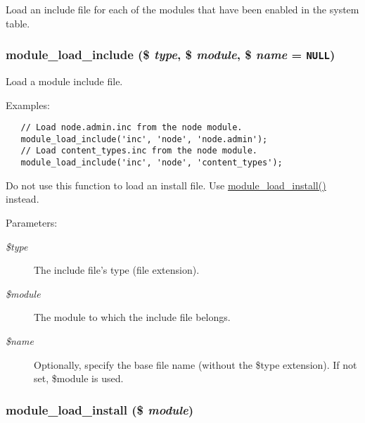 Load an include file for each of the modules that have been enabled in the system table. \hypertarget{module_8inc_49098ed4d33650ee5ab52aab40982423}{
\subsubsection[{module\_\-load\_\-include}]{\setlength{\rightskip}{0pt plus 5cm}module\_\-load\_\-include (\$ {\em type}, \/  \$ {\em module}, \/  \$ {\em name} = {\tt NULL})}}
\label{module_8inc_49098ed4d33650ee5ab52aab40982423}


Load a module include file.

Examples: 

\begin{Code}\begin{verbatim}   // Load node.admin.inc from the node module.
   module_load_include('inc', 'node', 'node.admin');
   // Load content_types.inc from the node module.
   module_load_include('inc', 'node', 'content_types');  
\end{verbatim}
\end{Code}



Do not use this function to load an install file. Use \hyperlink{module_8inc_77a6101f363c066eafbe29b26af5bfd3}{module\_\-load\_\-install()} instead.

\begin{Desc}
\item[Parameters:]
\begin{description}
\item[{\em \$type}]The include file's type (file extension). \item[{\em \$module}]The module to which the include file belongs. \item[{\em \$name}]Optionally, specify the base file name (without the \$type extension). If not set, \$module is used. \end{description}
\end{Desc}
\hypertarget{module_8inc_77a6101f363c066eafbe29b26af5bfd3}{
\subsubsection[{module\_\-load\_\-install}]{\setlength{\rightskip}{0pt plus 5cm}module\_\-load\_\-install (\$ {\em module})}}
\label{module_8inc_77a6101f363c066eafbe29b26af5bfd3}


